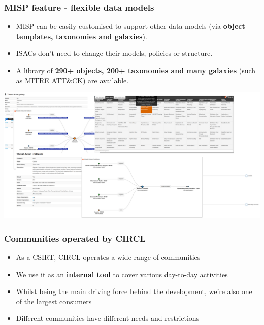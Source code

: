 \begin{frame}
    \frametitle{MISP feature - flexible data models} 
    \begin{itemize}
        \item MISP can be easily customised to support other data models (via {\bf object templates, taxonomies and galaxies}).
        \item ISACs don't need to change their models, policies or structure.
        \item A library of {\bf 290+ objects, 200+ taxonomies and many galaxies} (such as MITRE ATT\&CK) are available. 
    \end{itemize}
    \includegraphics[scale=0.12]{galaxy.png}
\end{frame}


\begin{frame}
\frametitle{Communities operated by CIRCL}
\begin{itemize}
        \item As a CSIRT, CIRCL operates a wide range of communities
        \item We use it as an {\bf internal tool} to cover various day-to-day activities
        \item Whilst being the main driving force behind the development, we're also one of the largest consumers
	\item Different communities have different needs and restrictions
\end{itemize}
\end{frame}

